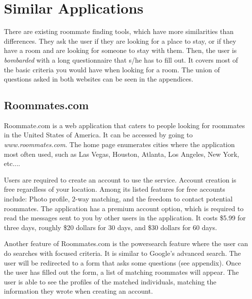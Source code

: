 \documentclass[journal]{./IEEE/IEEEtran}
\begin{document}
\section{Similar Applications}
There are existing roommate finding tools, which have more similarities than differences. They ask the user if they are looking for a place to stay, or if they have a room and are looking for someone to stay with them. Then, the user is \textit{bombarded} with a long questionnaire that s/he has to fill out. It covers most of the basic criteria you would have when looking for a room. The union of questions asked in both websites can be seen in the appendices.

\subsection{Roommates.com}
Roommate.com\cite{roommates.com} is a web application that caters to people looking for roommates in the United States of America. It can be accessed by going to \textit{www.roommates.com}. The home page enumerates cities where the application most often used, such as Las Vegas, Houston, Atlanta, Los Angeles, New York, etc....

Users are required to create an account to use the service. Account creation is free regardless of your location. Among its listed features for free accounts include: Photo profile, 2-way matching, and the freedom to contact potential roommates. The application has a premium account option, which is required to read the messages sent to you by other users in the application. It costs \$5.99 for three days, roughly \$20 dollars for 30 days, and \$30 dollars for 60 days.

Another feature of Roommates.com is the powersearch feature where the user can do searches with focused criteria. It is similar to Google's advanced search. The user will be redirected to a form that asks some questions (see appendix). Once the user has filled out the form, a list of matching roommates will appear. The user is able to see the profiles of the matched individuals, matching the information they wrote when creating an account.
\end{document}
